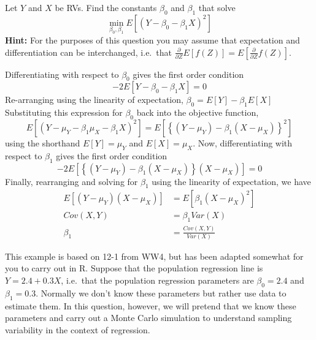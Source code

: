 \documentclass[addpoints,12pt]{exam}\usepackage[]{graphicx}\usepackage[]{color}
\begin{document}
\begin{questions}

\question Let $Y$ and $X$ be RVs. Find the constants $\beta_0$ and $\beta_1$ that solve  
\[
  \min_{\beta_0, \beta_1} E[(Y - \beta_0 - \beta_1 X)^2]
\]
\textbf{Hint:} For the purposes of this question you may assume that expectation and differentiation can be interchanged, i.e.\ that $\frac{\partial}{\partial Z} E[f(Z)] = E[\frac{\partial}{\partial Z} f(Z)]$.
\begin{solution}
  Differentiating with respect to $\beta_0$ gives the first order condition
  \[
    -2 E[Y - \beta_0 - \beta_1 X] = 0
    \]
  Re-arranging using the linearity of expectation, $\beta_0 = E[Y] - \beta_1 E[X]$
  Substituting this expression for $\beta_0$ back into the objective function, 
  \[
    E[(Y - \mu_Y - \beta_1 \mu_X - \beta_1 X)^2] = E\left[ \left\{ (Y-\mu_Y) - \beta_1 (X - \mu_X)\right\}^2\right]
  \]
  using the shorthand $E[Y] = \mu_Y$ and $E[X] = \mu_X$.
  Now, differentiating with respect to $\beta_1$ gives the first order condition
  \[
    -2 E\left[ \left\{(Y - \mu_Y) - \beta_1(X - \mu_X)\right\} (X - \mu_X)\right] = 0
    \]
 Finally, rearranging and solving for $\beta_1$ using the linearity of expectation, we have
 \begin{align*}
    E[(Y - \mu_Y)(X - \mu_X)] &=  E[\beta_1(X - \mu_X)^2]\\
    Cov(X,Y) &=  \beta_1 Var(X)\\
    \beta_1 &= \frac{Cov(X,Y)}{Var(X)}
 \end{align*}
\end{solution}

	\question This example is based on 12-1 from WW4, but has been adapted somewhat for you to carry out in R. Suppose that the population regression line is $Y = 2.4 + 0.3 X$, i.e.\ that the population regression parameters are $\beta_0 = 2.4$ and $\beta_1 = 0.3$. Normally we don't know these parameters but rather use data to estimate them. In this question, however, we will pretend that we know these parameters and carry out a Monte Carlo simulation to understand sampling variability in the context of regression.
	\begin{parts}

\end{parts}
\end{questions}
\end{document}
